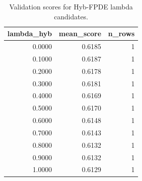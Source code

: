 \begin{table}[t]
\caption{Validation scores for Hyb-FPDE lambda candidates.}
\label{tab:lambda_distribution_computed}
\centering
\begin{tabular}{rrr}
\toprule
lambda\_hyb & mean\_score & n\_rows \\
\midrule
0.0000 & 0.6185 & 1 \\
0.1000 & 0.6187 & 1 \\
0.2000 & 0.6178 & 1 \\
0.3000 & 0.6181 & 1 \\
0.4000 & 0.6169 & 1 \\
0.5000 & 0.6170 & 1 \\
0.6000 & 0.6148 & 1 \\
0.7000 & 0.6143 & 1 \\
0.8000 & 0.6132 & 1 \\
0.9000 & 0.6132 & 1 \\
1.0000 & 0.6129 & 1 \\
\bottomrule
\end{tabular}

\end{table}
